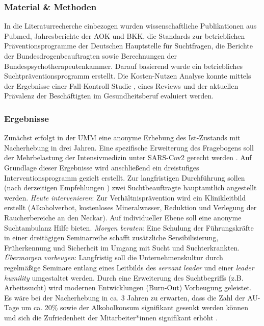 \documentclass[a4paper]{article}
\begin{document}

\subsubsection*{Material \& Methoden}


In die Literaturrecherche einbezogen wurden wissenschaftliche Publikationen aus Pubmed, Jahresberichte der AOK und BKK, die Standards zur betrieblichen Präventionsprogramme der Deutschen Hauptstelle für Suchtfragen, die Berichte der Bundesdrogenbeauftragten sowie Berechnungen der Bundespsychotherapeutenkammer. Darauf basierend wurde ein betriebliches Suchtpräventionsprogramm erstellt. Die Kosten-Nutzen Analyse konnte mittels der Ergebnisse einer Fall-Kontroll Studie  , eines Reviews  und der aktuellen Prävalenz der Beschäftigten im Gesundheitsberuf evaluiert werden.

\subsubsection*{Ergebnisse}


Zunächst erfolgt in der UMM eine anonyme Erhebung  des Ist-Zustands mit Nacherhebung in drei Jahren. Eine spezifische Erweiterung des Fragebogens soll der Mehrbelastung der Intensivmedizin unter SARS-Cov2 gerecht werden  . Auf Grundlage dieser Ergebnisse wird anschließend ein dreistufiges Interventionsprogramm gezielt erstellt. Zur langfristigen Durchführung sollen (nach derzeitigen Empfehlungen ) zwei Suchtbeauftragte hauptamtlich angestellt werden. \textit{Heute intervenieren}: Zur Verhältnisprävention wird ein Klinikleitbild erstellt (Alkoholverbot, kostenloses Mineralwasser, Reduktion und Verlegung der Raucherbereiche an den Neckar). Auf individueller Ebene soll eine anonyme Suchtambulanz Hilfe bieten. \textit{Morgen beraten}: Eine Schulung der Führungskräfte in einer dreitägigen Seminarreihe schafft zusätzliche Sensibilisierung, Früherkennung und Sicherheit im Umgang mit Sucht und Suchterkrankten. \textit{Übermorgen vorbeugen}: Langfristig soll die Unternehmenskultur durch regelmäßige Seminare entlang eines Leitbilds des \textit{servant leader} und einer \textit{leader humility} umgestaltet werden. Durch eine Erweiterung des Suchtbegriffs (z.B. Arbeitssucht) wird modernen Entwicklungen (Burn-Out) Vorbeugung geleistet. Es wäre bei der Nacherhebung in ca. 3 Jahren zu erwarten, dass die Zahl der AU-Tage um ca. 20\% sowie der Alkoholkonsum signifikant gesenkt werden können und sich die Zufriedenheit der Mitarbeiter*innen signifikant erhöht . 
\end{document}
